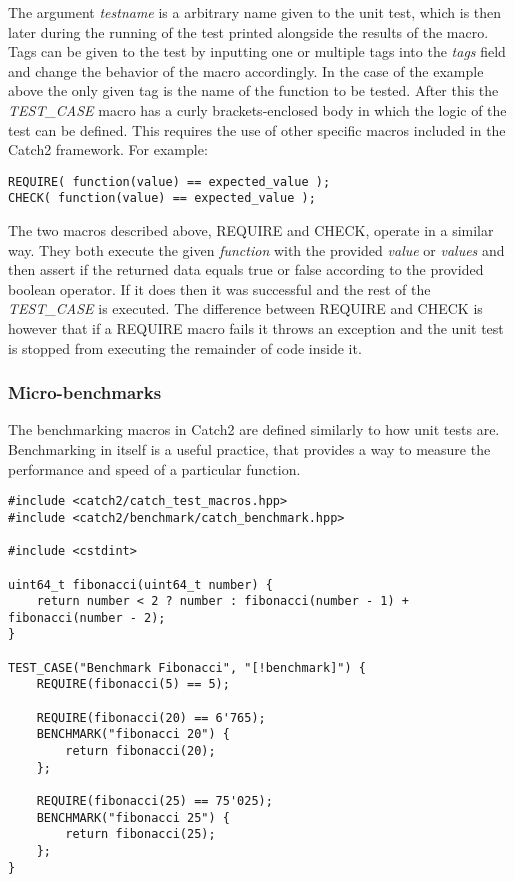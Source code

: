 The argument \textit{testname} is a arbitrary name given to the unit test, which is then later during the running of the test printed alongside the results of the macro.
Tags can be given to the test by inputting one or multiple tags into the \textit{tags} field and change the behavior of the macro accordingly. In the case of the example above
the only given tag is the name of the function to be tested. After this the \textit{TEST\_CASE} macro has a curly brackets-enclosed body in which the logic of the test can 
be defined.
This requires the use of other specific macros included in the Catch2 framework. For example:

\begin{verbatim}
REQUIRE( function(value) == expected_value );
CHECK( function(value) == expected_value );
\end{verbatim}

The two macros described above, REQUIRE and CHECK, operate in a similar way. They both execute the given \textit{function} with the provided \textit{value} or \textit{values}
and then assert if the returned data equals true or false according to the provided boolean operator. If it does then it was successful and the rest of the \textit{TEST\_CASE} is executed. The difference 
between REQUIRE and CHECK is however that if a REQUIRE macro fails it throws an exception and the unit test is stopped from executing the remainder of code inside it.

\subsubsection{Micro-benchmarks}
The benchmarking macros in Catch2 are defined similarly to how unit tests are. Benchmarking in itself is a useful practice, that provides a way to measure the performance
and speed of a particular function.

\begin{verbatim}
#include <catch2/catch_test_macros.hpp>
#include <catch2/benchmark/catch_benchmark.hpp>

#include <cstdint>

uint64_t fibonacci(uint64_t number) {
    return number < 2 ? number : fibonacci(number - 1) + fibonacci(number - 2);
}

TEST_CASE("Benchmark Fibonacci", "[!benchmark]") {
    REQUIRE(fibonacci(5) == 5);

    REQUIRE(fibonacci(20) == 6'765);
    BENCHMARK("fibonacci 20") {
        return fibonacci(20);
    };

    REQUIRE(fibonacci(25) == 75'025);
    BENCHMARK("fibonacci 25") {
        return fibonacci(25);
    };
}
\end{verbatim}


